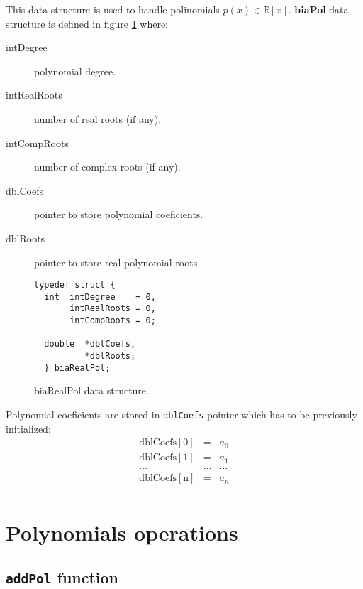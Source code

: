 This data structure is used to handle polinomials $p(x) \in \mathbb{R}[x]$. \textbf{biaPol} data structure is defined in figure \ref{fig:biaRealPol} where:
%
\begin{description}
\item[intDegree] polynomial degree.
\item[intRealRoots] number of real roots (if any).
\item[intCompRoots] number of complex roots (if any).
\item[dblCoefs] pointer to store polynomial coeficients.
\item[dblRoots] pointer to store real polynomial roots.
\end{description}
%
\begin{figure}[!h]
\begin{verbatim}
typedef struct {
  int  intDegree    = 0,
       intRealRoots = 0,
       intCompRoots = 0;

  double  *dblCoefs,
          *dblRoots;
  } biaRealPol;
\end{verbatim}
\caption{biaRealPol data structure.} \label{fig:biaRealPol}
\end{figure}
%
\FloatBarrier
%
Polynomial coeficients are stored in \texttt{dblCoefs} pointer which has to be previously initialized:
%
\begin{eqnarray*}
  \mathrm{dblCoefs[0]} & = & a_0 \\
  \mathrm{dblCoefs[1]} & = & a_1 \\
  \dots & \dots & \dots \\
  \mathrm{dblCoefs[n]} & = & a_n \\
\end{eqnarray*}
%

\section{Polynomials operations}

\subsection{\texttt{addPol} function}

